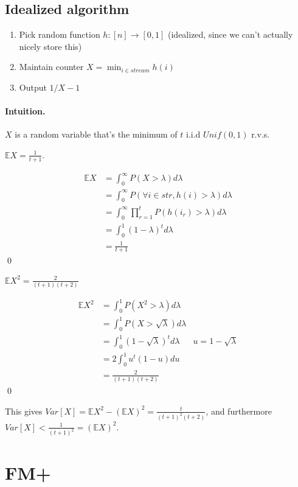 \documentclass[11pt]{article}
\begin{document}
\subsection{Idealized algorithm}

\begin{enumerate}
\item Pick random function $h: [n] \to [0,1]$ (idealized, since we can't actually nicely store this)
\item Maintain counter $X = \min_{i \in stream} h(i)$
\item Output $1/X - 1$
\end{enumerate}

\paragraph{Intuition.} $X$ is a random variable that's the minimum of $t$ i.i.d $Unif(0,1)$ r.v.s.

\claim $\mathbb E X = \frac{1}{t+1}$.

\proof 
\begin{align*}
\mathbb E X &= \int_0^\infty P(X > \lambda) d\lambda \\
&= \int_0^\infty P(\forall i \in str, h(i) > \lambda)d\lambda \\
&= \int_0^\infty \prod_{r=1}^t P(h(i_r) > \lambda)d\lambda \\
&= \int_0^1 (1 - \lambda)^t d\lambda \\
&= \frac{1}{t+1}
\end{align*} \qed

\claim $\mathbb E X^2 = \frac{2}{(t+1)(t+2)}$

\proof
\begin{align*}
\mathbb E X^2 &= \int_0^1 P(X^2 > \lambda)d\lambda \\
&= \int_0^1 P(X > \sqrt{\lambda}) d\lambda \\
&= \int_0^1 (1 - \sqrt{\lambda})^t d\lambda & u = 1 - \sqrt{\lambda} \\
&= 2 \int_0^1 u^t (1 - u) du \\
&= \frac{2}{(t+1)(t+2)}
\end{align*} \qed

This gives $Var[X] = \mathbb E X^2 - (\mathbb E X)^2 = \frac{t}{(t+1)^2(t+2)}$, and furthermore $Var[X] < \frac{1}{(t+1)^2} = (\mathbb E X)^2$.

\section{FM+}
\end{document}
